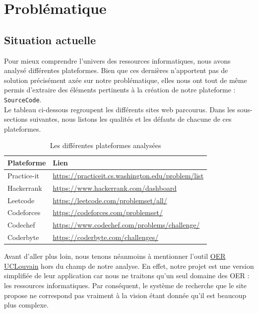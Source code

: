 \chapter{Problématique}
\section{Situation actuelle}

Pour mieux comprendre l'univers des ressources informatiques, nous avons analysé différentes plateformes. Bien que ces dernières n'apportent pas de solution précisément axée sur notre problématique, elles nous ont tout de même permis d'extraire des éléments pertinents à la création de notre plateforme : \texttt{SourceCode}.\\

Le tableau ci-dessous regroupent les différents sites web parcourus. Dans les sous-sections suivantes, nous listons les qualités et les défauts de chacune de ces plateformes.\\

\begin{table}[H]
    \centering
    \begin{tabular}{| l | l |}
    \hline
        Plateforme & Lien \\
    \hline
        Practice-it &
        \href{https://practiceit.cs.washington.edu/problem/list}{https://practiceit.cs.washington.edu/problem/list} \\ 
    \hline
        Hackerrank &
        \href{https://www.hackerrank.com/dashboard}{https://www.hackerrank.com/dashboard} \\ 
    \hline
        Leetcode &
        \href{https://leetcode.com/problemset/all/}{https://leetcode.com/problemset/all/} \\ 
    \hline
        Codeforces &
        \href{https://codeforces.com/problemset/}{https://codeforces.com/problemset/} \\ 
    \hline
        Codechef &
        \href{https://www.codechef.com/problems/challenge/}{https://www.codechef.com/problems/challenge/} \\ 
    \hline
        Coderbyte &
        \href{https://coderbyte.com/challenges/}{https://coderbyte.com/challenges/} \\ 
    \hline
    \end{tabular}
    \caption{Les différentes plateformes analysées}
    \label{table:compPlateforme}
\end{table}

Avant d'aller plus loin, nous tenons néanmoins à mentionner l'outil \href{https://oer.uclouvain.be/}{OER UCLouvain} hors du champ de notre analyse. En effet, notre projet est une version simplifiée de leur application car nous ne traitons qu'un seul domaine des \gls{OER} : les ressources informatiques. Par conséquent, le système de recherche que le site propose ne correspond pas vraiment à la vision  étant donnée qu'il est beaucoup plus complexe.

